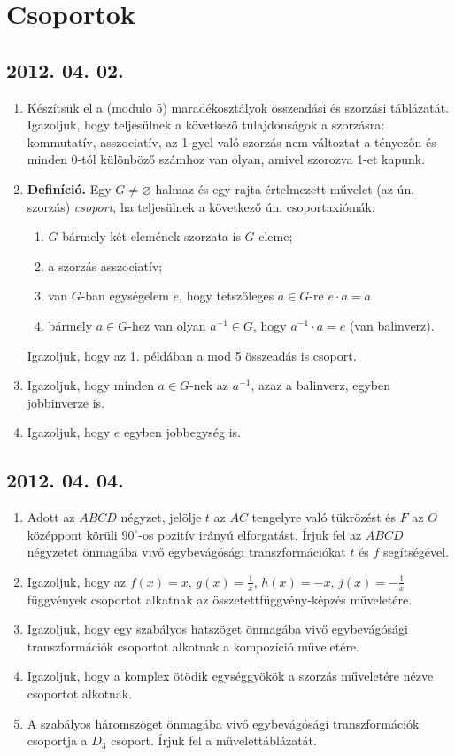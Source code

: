 \documentclass{article}
\begin{document}
\section*{Csoportok}

\subsection*{2012. 04. 02.}
\begin{enumerate}
\item Készítsük el a (modulo 5) maradékosztályok összeadási és szorzási táblázatát.\\ Igazoljuk, hogy teljesülnek a következő tulajdonságok a szorzásra: kommutatív, asszociatív, az 1-gyel való szorzás nem változtat a tényezőn és minden 0-tól különböző számhoz van olyan, amivel szorozva 1-et kapunk.
\item \textbf{Definíció.} Egy $G\ne\varnothing$ halmaz és egy rajta értelmezett művelet (az ún. szorzás) \emph{csoport}, ha teljesülnek a következő ún. csoportaxiómák:
\begin{enumerate}[label=(\arabic*)]
\item $G$ bármely két elemének szorzata is $G$ eleme;
\item a szorzás asszociatív;
\item van $G$-ban egységelem $e$, hogy tetszőleges $a\in G$-re $e\cdot a=a$
\item bármely $a\in G$-hez van olyan $a^{-1}\in G$, hogy $a^{-1}\cdot a=e$ (van balinverz).
\end{enumerate}
Igazoljuk, hogy az 1. példában a mod 5 összeadás is csoport.
\item Igazoljuk, hogy minden $a\in G$-nek az $a^{-1}$, azaz a balinverz, egyben jobbinverze is.
\item Igazoljuk, hogy $e$ egyben jobbegység is.
\end{enumerate}

\subsection*{2012. 04. 04.}
\begin{enumerate}
\item Adott az $ABCD$ négyzet, jelölje $t$ az $AC$ tengelyre való tükrözést és $F$ az $O$ középpont körüli $90^\circ$-os pozitív irányú elforgatást. Írjuk fel az $ABCD$ négyzetet önmagába vivő egybevágósági transzformációkat $t$ és $f$ segítségével.
\item Igazoljuk, hogy az $f(x)=x$, $g(x)=\frac{1}{x}$, $h(x)=-x$, $j(x)=-\frac{1}{x}$ függvények csoportot alkatnak az összetettfüggvény-képzés műveletére.
\item Igazoljuk, hogy egy szabályos hatszöget önmagába vivő egybevágósági transzformációk csoportot alkotnak a kompozíció műveletére.
\item Igazoljuk, hogy a komplex ötödik egységgyökök a szorzás műveletére nézve csoportot alkotnak.
\item A szabályos háromszöget önmagába vivő egybevágósági transzformációk csoportja a $D_3$ csoport. Írjuk fel a művelettáblázatát.
\end{enumerate}
\end{document}

